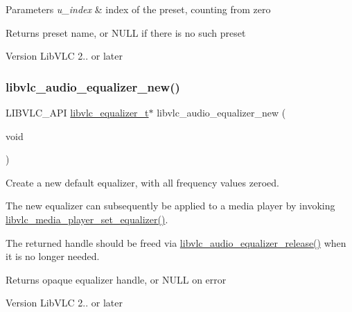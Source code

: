 \begin{DoxyParams}{Parameters}
{\em u\+\_\+index} & index of the preset, counting from zero \\
\hline
\end{DoxyParams}
\begin{DoxyReturn}{Returns}
preset name, or N\+U\+LL if there is no such preset 
\end{DoxyReturn}
\begin{DoxyVersion}{Version}
Lib\+V\+LC 2.. or later 
\end{DoxyVersion}
\mbox{\label{group__libvlc__audio_gad252fff10bf02bc8436b3beab4badef9}} 
\subsubsection{\texorpdfstring{libvlc\+\_\+audio\+\_\+equalizer\+\_\+new()}{libvlc\_audio\_equalizer\_new()}}
{\footnotesize\ttfamily L\+I\+B\+V\+L\+C\+\_\+\+A\+PI \hyperlink{group__libvlc__media__player_ga1ea141a84d68d0147fc58d99bfc83ab7}{libvlc\+\_\+equalizer\+\_\+t}$\ast$ libvlc\+\_\+audio\+\_\+equalizer\+\_\+new (\begin{DoxyParamCaption}\item[{void}]{ }\end{DoxyParamCaption})}

Create a new default equalizer, with all frequency values zeroed.

The new equalizer can subsequently be applied to a media player by invoking \hyperlink{group__libvlc__audio_ga0d355443d391d0bc2dafe9b6963a8f53}{libvlc\+\_\+media\+\_\+player\+\_\+set\+\_\+equalizer()}.

The returned handle should be freed via \hyperlink{group__libvlc__audio_gae574f86a29c7dbe9eeb1f3d397262e55}{libvlc\+\_\+audio\+\_\+equalizer\+\_\+release()} when it is no longer needed.

\begin{DoxyReturn}{Returns}
opaque equalizer handle, or N\+U\+LL on error 
\end{DoxyReturn}
\begin{DoxyVersion}{Version}
Lib\+V\+LC 2.. or later 
\end{DoxyVersion}
\mbox{\label{group__libvlc__audio_ga41d6921b8a10f90c4ad9fd3bf844f035}} 
